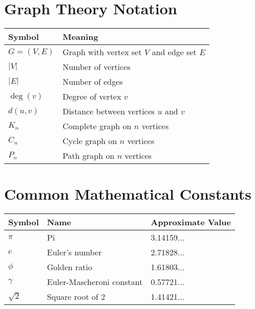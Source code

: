 \section{Graph Theory Notation}

\begin{tabular}{|l|l|}
\hline
\textbf{Symbol} & \textbf{Meaning} \\
\hline
$G = (V, E)$ & Graph with vertex set $V$ and edge set $E$ \\
$|V|$ & Number of vertices \\
$|E|$ & Number of edges \\
$\deg(v)$ & Degree of vertex $v$ \\
$d(u, v)$ & Distance between vertices $u$ and $v$ \\
$K_n$ & Complete graph on $n$ vertices \\
$C_n$ & Cycle graph on $n$ vertices \\
$P_n$ & Path graph on $n$ vertices \\
\hline
\end{tabular}

\section{Common Mathematical Constants}

\begin{tabular}{|l|l|l|}
\hline
\textbf{Symbol} & \textbf{Name} & \textbf{Approximate Value} \\
\hline
$\pi$ & Pi & 3.14159... \\
$e$ & Euler's number & 2.71828... \\
$\phi$ & Golden ratio & 1.61803... \\
$\gamma$ & Euler-Mascheroni constant & 0.57721... \\
$\sqrt{2}$ & Square root of 2 & 1.41421... \\
\hline
\end{tabular}
